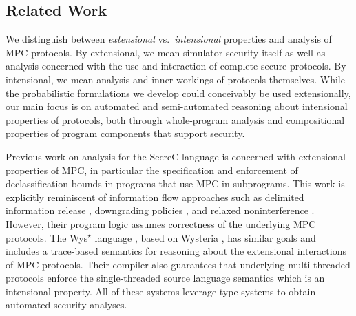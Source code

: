 \subsection{Related Work}

We distinguish between \emph{extensional} vs.~\emph{intensional}
properties and analysis of MPC protocols. By extensional, we mean
simulator security itself as well as analysis concerned with the use
and interaction of complete secure protocols. By intensional, we mean
analysis and inner workings of protocols themselves. While the
probabilistic formulations we develop could conceivably be used
extensionally, our main focus is on automated and semi-automated
reasoning about intensional properties of protocols, both through
whole-program analysis and compositional properties of program
components that support security. 

Previous work on analysis for the SecreC language
\cite{almeida2018enforcing,10.1145/2637113.2637119} is concerned with
extensional properties of MPC, in particular the specification and
enforcement of declassification bounds in programs that use MPC in
subprograms. This work is explicitly reminiscent of information flow
approaches such as delimited information release
\cite{10.1007/978-3-540-37621-7_9}, downgrading policies \cite{li2005downgrading}, and
relaxed noninterference \cite{10.1145/1040305.1040319}. However, their
program logic assumes correctness of the underlying MPC protocols.
The Wys$^\star$ language \cite{wysstar}, based on Wysteria
\cite{rastogi2014wysteria}, has similar goals and includes a
trace-based semantics for reasoning about the extensional interactions
of MPC protocols. Their compiler also guarantees that underlying
multi-threaded protocols enforce the single-threaded source language
semantics which is an intensional property.  All of these systems
leverage type systems to obtain automated security analyses.

